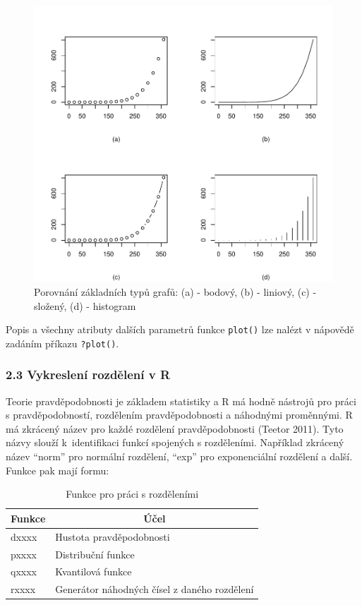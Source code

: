 \documentclass[12pt,]{article}
\begin{document}
\begin{figure}[H]

{\centering \includegraphics[width=0.8\linewidth]{BP_files/figure-latex/graf_typy-1} 

}

\caption{\label{fig:ch2.1} Porovnání základních typů grafů: (a) - bodový, (b) - liniový, (c) - složený, (d) - histogram}\label{fig:graf_typy}
\end{figure}

Popis a všechny atributy dalších parametrů funkce \texttt{plot()} lze
nalézt v nápovědě zadáním příkazu \texttt{?plot()}.

\hypertarget{distribution}{\subsubsection{2.3 Vykreslení rozdělení v
R}\label{distribution}}

\qquad Teorie pravděpodobnosti je základem statistiky a R má hodně
nástrojů pro práci s pravděpodobností, rozdělením pravděpodobnosti a
náhodnými proměnnými. R má zkrácený název pro každé rozdělení
pravděpodobnosti (Teetor 2011). Tyto názvy slouží k~identifikaci funkcí
spojených s rozděleními. Například zkrácený název \enquote{norm} pro
normální rozdělení, \enquote{exp} pro exponenciální rozdělení a další.
Funkce pak mají formu:

\begin{table}[H]
\centering
\begin{tabular}{|l|l|}
\hline
Funkce & \multicolumn{1}{c|}{Účel}                    \\ \hline
dxxxx  & Hustota pravděpodobnosti                     \\ \hline
pxxxx  & Distribuční funkce                           \\ \hline
qxxxx  & Kvantilová funkce                            \\ \hline
rxxxx  & Generátor náhodných čísel z daného rozdělení \\ \hline
\end{tabular}
\caption{Funkce pro práci s rozděleními}
\label{tab2}
\end{table}
\end{document}
